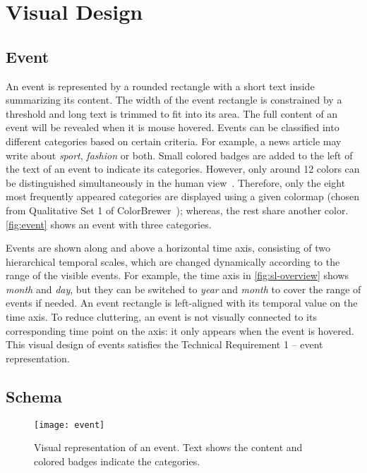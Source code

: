 \section{Visual Design}

\subsection{Event}
An event is represented by a rounded rectangle with a short text inside summarizing its content. The width of the event rectangle is constrained by a threshold and long text is trimmed to fit into its area. The full content of an event will be revealed when it is mouse hovered. Events can be classified into different categories based on certain criteria. For example, a news article may write about \emph{sport}, \emph{fashion} or both. Small colored badges are added to the left of the text of an event to indicate its categories. However, only around 12 colors can be distinguished simultaneously in the human view~\cite{Munzner2014}. Therefore, only the eight most frequently appeared categories are displayed using a given colormap (chosen from Qualitative Set 1 of  ColorBrewer~\cite{Harrower2003}); whereas, the rest share another color. \autoref{fig:event} shows an event with three categories.

Events are shown along and above a horizontal time axis, consisting of two hierarchical temporal scales, which are changed dynamically according to the range of the visible events. For example, the time axis in \autoref{fig:sl-overview} shows \emph{month} and \emph{day}, but they can be switched to \emph{year} and \emph{month} to cover the range of events if needed. An event rectangle is left-aligned with its temporal value on the time axis. To reduce cluttering, an event is not visually connected to its corresponding time point on the axis: it only appears when the event is hovered. This visual design of events satisfies the Technical Requirement 1 -- event representation.

\subsection{Schema}
\label{sub:schema}

\begin{figure}
\centering
\texttt{[image: event]}
\caption[Visual representation of an event]{Visual representation of an event. Text shows the content and colored badges indicate the categories.}
\label{fig:event}
\end{figure}

